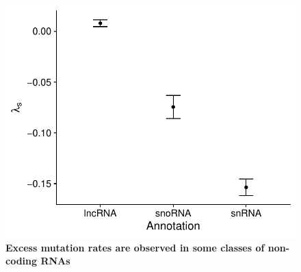 \documentclass{article}
\begin{document}
\begin{figure}
    \centering
    \includegraphics[width = 0.6\linewidth]{supplemental_figures/noncoding_rnas_constraint.pdf}
    \caption{\textbf{Excess mutation rates are observed in some classes of non-coding RNAs}}
    \label{fig:extra_insight_model}
\end{figure}
\end{document}
